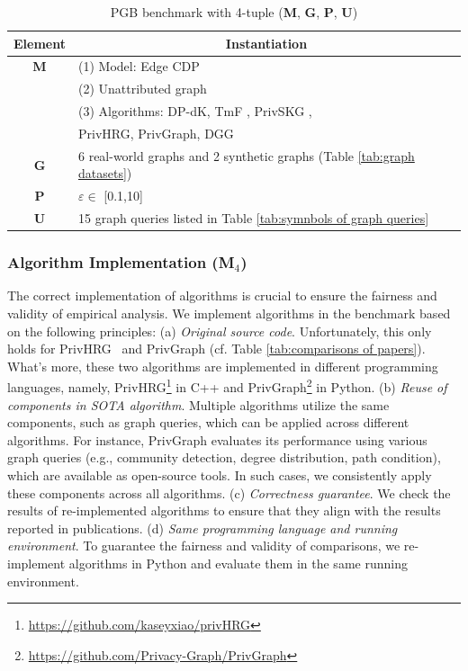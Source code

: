 \documentclass[conference]{IEEEtran}
\theoremstyle{plain}
\begin{document}
\begin{table}[t]
\small
   \caption{PGB benchmark with 4-tuple (\textbf{M}, \textbf{G}, \textbf{P}, \textbf{U})}
	\label{tab:benchmark instantiation}
	\centering
		\begin{tabular}{|c|l|}
			\hline
               Element &  \multicolumn{1}{c|}{Instantiation} \\ \hline
        \textbf{M}  & (1) Model: Edge CDP \\ 
        &  (2) Unattributed graph \\ 
        &  (3) Algorithms:  DP-dK\cite{wang2013preserving},  TmF \cite{nguyen2015differentially}, PrivSKG \cite{mir2012differentially}, \\ 
        &  PrivHRG\cite{xiao2014differentially}, PrivGraph\cite{yuan2023privgraph}, DGG\cite{qin2017generating}\\
        \textbf{G} & 6 real-world graphs and 2 synthetic graphs (Table \ref{tab:graph datasets})\\
        \textbf{P} & $\varepsilon\in$ [0.1,10] \\
        \textbf{U} & 15 graph queries listed in Table \ref{tab:symnbols of graph queries}\\        
               \hline
   \end{tabular}
\end{table}

\subsubsection{Algorithm Implementation (\textbf{M$_4$})}
The correct implementation of algorithms is crucial to ensure the fairness and validity of empirical analysis. 
We implement algorithms in the benchmark based on the following principles:
(a) \textit{Original source code}. 
Unfortunately, this only holds for PrivHRG~\cite{xiao2014differentially} and PrivGraph \cite{yuan2023privgraph} (cf. Table \ref{tab:comparisons of papers}).
What's more, these two algorithms are implemented in different programming languages, namely, PrivHRG\footnote{\url{https://github.com/kaseyxiao/privHRG}} in C++ and PrivGraph\footnote{\url{https://github.com/Privacy-Graph/PrivGraph}} in Python.
(b) \textit{Reuse of components in SOTA algorithm}.
Multiple algorithms utilize the same components, such as graph queries, which can be applied across different algorithms. 
For instance, PrivGraph evaluates its performance using various graph queries (e.g., community detection, degree distribution, path condition), which are available as open-source tools. 
In such cases, we consistently apply these components across all algorithms.
(c) \textit{Correctness guarantee}.
We check the results of re-implemented algorithms to ensure that they align with the results reported in publications.
(d) \textit{Same programming language and running environment}.
To guarantee the fairness and validity of comparisons, we re-implement algorithms in Python and evaluate them in the same running environment.
\end{document}
